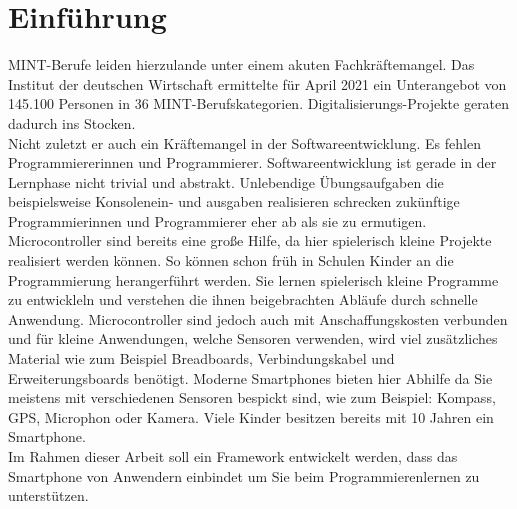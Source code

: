 \documentclass[11pt,a4paper]{report}
\begin{document}

\begin{abstract} 

\end{abstract}

\tableofcontents

\chapter{Einführung} \label{chap:intro}
MINT-Berufe leiden hierzulande unter einem akuten Fachkräftemangel.
Das Institut der deutschen Wirtschaft ermittelte für April 2021 ein Unterangebot von 145.100 Personen in 36 MINT-Berufskategorien. \cite{mint_jahresreport}
Digitalisierungs-Projekte geraten dadurch ins Stocken.
\\
Nicht zuletzt er auch ein Kräftemangel in der Softwareentwicklung.
Es fehlen Programmiererinnen und Programmierer.
Softwareentwicklung ist gerade in der Lernphase nicht trivial und abstrakt.
Unlebendige Übungsaufgaben die beispielsweise Konsolenein- und ausgaben realisieren schrecken zukünftige Programmierinnen und Programmierer eher ab als sie zu ermutigen.
\\
Microcontroller sind bereits eine große Hilfe, da hier spielerisch kleine Projekte realisiert werden können.
So können schon früh in Schulen Kinder an die Programmierung herangerführt werden.
Sie lernen spielerisch kleine Programme zu entwickleln und verstehen die ihnen beigebrachten Abläufe durch schnelle Anwendung.
Microcontroller sind jedoch auch mit Anschaffungskosten verbunden und für kleine Anwendungen, welche Sensoren verwenden, wird viel zusätzliches Material wie zum Beispiel Breadboards, Verbindungskabel und Erweiterungsboards benötigt.
Moderne Smartphones bieten hier Abhilfe da Sie meistens mit verschiedenen Sensoren bespickt sind, wie zum Beispiel: Kompass, GPS, Microphon oder Kamera.
Viele Kinder besitzen bereits mit 10 Jahren ein Smartphone. 
\cite{bitkom_smartphones}
\\
Im Rahmen dieser Arbeit soll ein Framework entwickelt werden, dass das Smartphone von Anwendern einbindet um Sie beim Programmierenlernen zu unterstützen.
\end{document}
